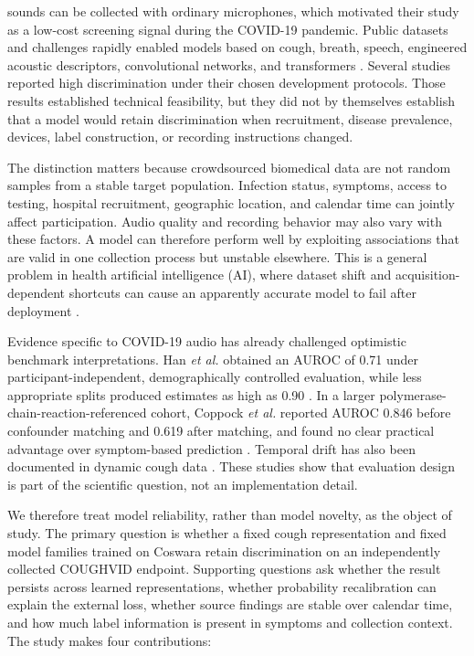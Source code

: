 \documentclass[journal]{IEEEtran}
\begin{document}
 sounds can be collected with ordinary microphones, which motivated their study as a low-cost screening signal during the COVID-19 pandemic. Public datasets and challenges rapidly enabled models based on cough, breath, speech, engineered acoustic descriptors, convolutional networks, and transformers \cite{laguarta2020cough,brown2020crowdsourced,muguli2021dicova,schuller2021compare,aytekin2024hst}. Several studies reported high discrimination under their chosen development protocols. Those results established technical feasibility, but they did not by themselves establish that a model would retain discrimination when recruitment, disease prevalence, devices, label construction, or recording instructions changed.

The distinction matters because crowdsourced biomedical data are not random samples from a stable target population. Infection status, symptoms, access to testing, hospital recruitment, geographic location, and calendar time can jointly affect participation. Audio quality and recording behavior may also vary with these factors. A model can therefore perform well by exploiting associations that are valid in one collection process but unstable elsewhere. This is a general problem in health artificial intelligence (AI), where dataset shift and acquisition-dependent shortcuts can cause an apparently accurate model to fail after deployment \cite{subbaswamy2020shift,quinonero2009datasetshift,ly2024shortcut,degrave2021shortcuts}.

Evidence specific to COVID-19 audio has already challenged optimistic benchmark interpretations. Han \emph{et al.} obtained an AUROC of 0.71 under participant-independent, demographically controlled evaluation, while less appropriate splits produced estimates as high as 0.90 \cite{han2022sounds}. In a larger polymerase-chain-reaction-referenced cohort, Coppock \emph{et al.} reported AUROC 0.846 before confounder matching and 0.619 after matching, and found no clear practical advantage over symptom-based prediction \cite{coppock2024symptoms}. Temporal drift has also been documented in dynamic cough data \cite{ganitidis2025drift}. These studies show that evaluation design is part of the scientific question, not an implementation detail.

We therefore treat model reliability, rather than model novelty, as the object of study. The primary question is whether a fixed cough representation and fixed model families trained on Coswara retain discrimination on an independently collected COUGHVID endpoint. Supporting questions ask whether the result persists across learned representations, whether probability recalibration can explain the external loss, whether source findings are stable over calendar time, and how much label information is present in symptoms and collection context. The study makes four contributions:
\end{document}
